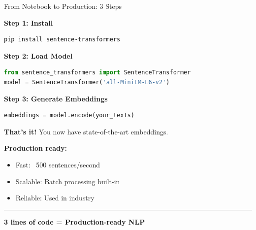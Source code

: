 \documentclass[8pt,aspectratio=169]{beamer}
\newcommand{\bottomnote}[1]{%
\vfill
\vspace{-2mm}
\textcolor{mllavender2}{\rule{\textwidth}{0.4pt}}
\vspace{1mm}
\footnotesize
\textbf{#1}
}
\begin{document}
\begin{frame}[t,fragile]{From Notebook to Production: 3 Steps}

\textbf{Step 1: Install}
\begin{lstlisting}[language=bash]
pip install sentence-transformers
\end{lstlisting}

\vspace{0.3cm}

\textbf{Step 2: Load Model}
\begin{lstlisting}[language=Python]
from sentence_transformers import SentenceTransformer
model = SentenceTransformer('all-MiniLM-L6-v2')
\end{lstlisting}

\vspace{0.3cm}

\textbf{Step 3: Generate Embeddings}
\begin{lstlisting}[language=Python]
embeddings = model.encode(your_texts)
\end{lstlisting}

\vspace{0.5cm}

\textbf{That's it!} You now have state-of-the-art embeddings.

\vspace{0.5cm}

\textbf{Production ready:}
\begin{itemize}
    \item Fast: ~500 sentences/second
    \item Scalable: Batch processing built-in
    \item Reliable: Used in industry
\end{itemize}

\bottomnote{3 lines of code = Production-ready NLP}
\end{frame}
\end{document}
